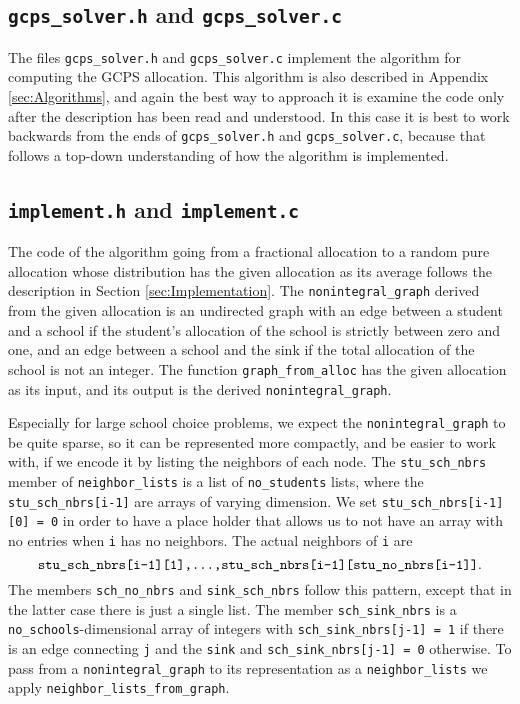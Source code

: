 \documentclass[12pt]{article}
\theoremstyle{definition}
\begin{document}
\begin{appendix}
\subsection{\texttt{gcps\_solver.h} and \texttt{gcps\_solver.c}}
\label{subsec:Solver}

The files \texttt{gcps\_solver.h} and \texttt{gcps\_solver.c}
implement the algorithm for computing the GCPS allocation.  This
algorithm is also described in Appendix \ref{sec:Algorithms}, and
again the best way to approach it is examine the code only after the
description has been read and understood.  In this case it is best to
work backwards from the ends of \texttt{gcps\_solver.h} and
\texttt{gcps\_solver.c}, because that follows a top-down understanding
of how the algorithm is implemented.

\subsection{\texttt{implement.h} and \texttt{implement.c}}

The code of the algorithm going from a fractional allocation to a
random pure allocation whose distribution has the given allocation as
its average follows the description in Section
\ref{sec:Implementation}.  The \texttt{nonintegral\_graph} derived
from the given allocation is an undirected graph with an edge between
a student and a school if the student's allocation of the school is
strictly between zero and one, and an edge between a school and the
sink if the total allocation of the school is not an integer.  The
function \texttt{graph\_from\_alloc} has the given allocation as its
input, and its output is the derived \texttt{nonintegral\_graph}.

Especially for large school choice problems, we expect the
\texttt{nonintegral\_graph} to be quite sparse, so it can be
represented more compactly, and be easier to work with, if we encode
it by listing the neighbors of each node.  The \texttt{stu\_sch\_nbrs}
member of \texttt{neighbor\_lists} is a list of \texttt{no\_students}
lists, where the \texttt{stu\_sch\_nbrs[i-1]} are arrays of varying
dimension. We set \texttt{stu\_sch\_nbrs[i-1][0] = 0} in order to have
a place holder that allows us to not have an array with no entries
when \texttt{i} has no neighbors.  The actual neighbors of \texttt{i}
are
$$\text{\texttt{stu\_sch\_nbrs[i-1][1],...,stu\_sch\_nbrs[i-1][stu\_no\_nbrs[i-1]]}}.$$
The members \texttt{sch\_no\_nbrs} and \texttt{sink\_sch\_nbrs} follow
this pattern, except that in the latter case there is just a single
list.  The member \texttt{sch\_sink\_nbrs} is a
\texttt{no\_schools}-dimensional array of integers with
\texttt{sch\_sink\_nbrs[j-1] = 1} if there is an edge connecting
\texttt{j} and the \texttt{sink} and \texttt{sch\_sink\_nbrs[j-1] = 0}
otherwise.  To pass from a \texttt{nonintegral\_graph} to its
representation as a \texttt{neighbor\_lists} we apply
\texttt{neighbor\_lists\_from\_graph}.


\end{appendix}
\end{document}
